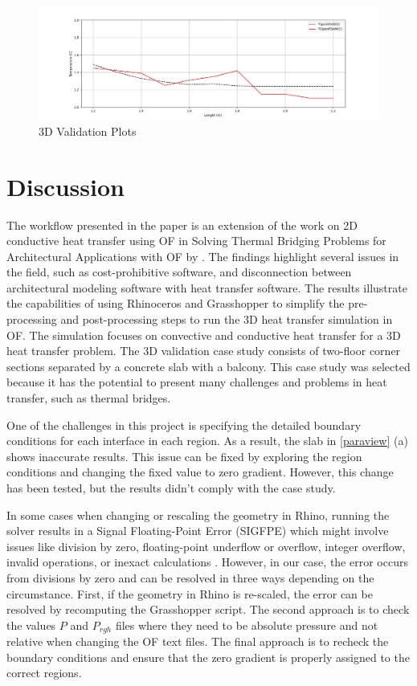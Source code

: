 \begin{figure}[H] 
\centering
\includegraphics[width=1\columnwidth]{Figures/Figure_2.png}
\hspace{0.7cm}
\caption{3D Validation Plots}
\label{fig:validation-plots}
\end{figure}



\section{Discussion}


The workflow presented in the paper is an extension of the work on 2D conductive heat transfer using \gls{OF} in Solving Thermal Bridging Problems for Architectural Applications with  \gls{OF} by \cite{kastner2020solving}. 
The findings highlight several issues in the field, such as cost-prohibitive software, and disconnection between architectural modeling software with heat transfer software. 
The results illustrate the capabilities of using Rhinoceros and Grasshopper to simplify the pre-processing and post-processing steps to run the 3D heat transfer simulation in \gls{OF}. The simulation focuses on convective and conductive heat transfer for a 3D heat transfer problem. The 3D validation case study consists of two-floor corner sections separated by a concrete slab with a balcony. This case study was selected because it has the potential to present many challenges and problems in heat transfer, such as thermal bridges.

One of the challenges in this project is specifying the detailed boundary conditions for each interface in each region. As a result, the slab in \ref{paraview} (a) shows inaccurate results. This issue can be fixed by exploring the region conditions and changing the fixed value to zero gradient. However, this change has been tested, but the results didn't comply with the case study. 


In some cases when changing or rescaling the geometry in Rhino, running the solver results in a Signal Floating-Point Error (SIGFPE) which might involve issues like division by zero, floating-point underflow or overflow, integer overflow, invalid operations, or inexact calculations \cite{sigfpe}. However, in our case, the error occurs from divisions by zero and can be resolved in three ways depending on the circumstance. First, if the geometry in Rhino is re-scaled, the error can be resolved by recomputing the Grasshopper script. The second approach is to check the values $P$ and $P_{rgh}$ files where they need to be absolute pressure and not relative when changing the \gls{OF} text files. The final approach is to recheck the boundary conditions and ensure that the zero gradient is properly assigned to the correct regions.


